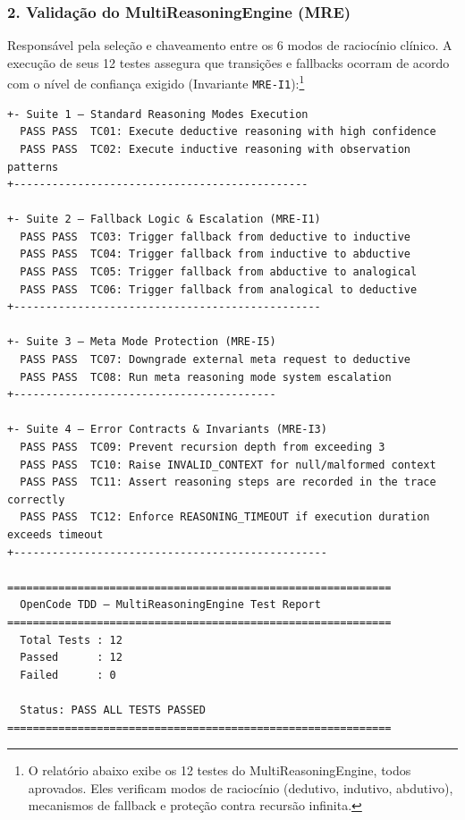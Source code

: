 \subsubsection*{2. Validação do MultiReasoningEngine (MRE)}

Responsável pela seleção e chaveamento entre os 6 modos de raciocínio clínico. A execução de seus 12 testes assegura que transições e fallbacks ocorram de acordo com o nível de confiança exigido (Invariante \texttt{MRE-I1}):\footnote{O relatório abaixo exibe os 12 testes do MultiReasoningEngine, todos aprovados. Eles verificam modos de raciocínio (dedutivo, indutivo, abdutivo), mecanismos de fallback e proteção contra recursão infinita.}

\begin{lstlisting}[style=bashstyle, caption={Saída do Executor de Testes do OpenCode MultiReasoningEngine}, label={lst:tdd_mre_output}]
+- Suite 1 — Standard Reasoning Modes Execution
  PASS PASS  TC01: Execute deductive reasoning with high confidence
  PASS PASS  TC02: Execute inductive reasoning with observation patterns
+----------------------------------------------

+- Suite 2 — Fallback Logic & Escalation (MRE-I1)
  PASS PASS  TC03: Trigger fallback from deductive to inductive
  PASS PASS  TC04: Trigger fallback from inductive to abductive
  PASS PASS  TC05: Trigger fallback from abductive to analogical
  PASS PASS  TC06: Trigger fallback from analogical to deductive
+------------------------------------------------

+- Suite 3 — Meta Mode Protection (MRE-I5)
  PASS PASS  TC07: Downgrade external meta request to deductive
  PASS PASS  TC08: Run meta reasoning mode system escalation
+-----------------------------------------

+- Suite 4 — Error Contracts & Invariants (MRE-I3)
  PASS PASS  TC09: Prevent recursion depth from exceeding 3
  PASS PASS  TC10: Raise INVALID_CONTEXT for null/malformed context
  PASS PASS  TC11: Assert reasoning steps are recorded in the trace correctly
  PASS PASS  TC12: Enforce REASONING_TIMEOUT if execution duration exceeds timeout
+-------------------------------------------------

============================================================
  OpenCode TDD — MultiReasoningEngine Test Report
============================================================
  Total Tests : 12
  Passed      : 12
  Failed      : 0

  Status: PASS ALL TESTS PASSED
============================================================
\end{lstlisting}

